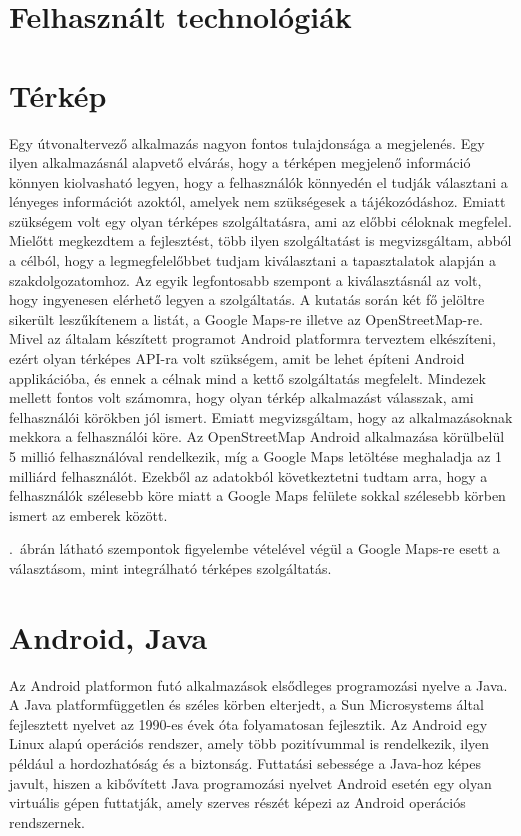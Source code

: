 	

\section{Felhasznált technológiák}
\label{felhaszntech}
\section*{Térkép}
Egy útvonaltervező alkalmazás nagyon fontos tulajdonsága a megjelenés. 
Egy ilyen alkalmazásnál alapvető elvárás, hogy a térképen megjelenő információ könnyen kiolvasható legyen, hogy a felhasználók könnyedén el tudják választani a lényeges információt azoktól, amelyek nem szükségesek a tájékozódáshoz. 
Emiatt szükségem volt egy olyan térképes szolgáltatásra, ami az előbbi céloknak megfelel. 
Mielőtt megkezdtem a fejlesztést, több ilyen szolgáltatást is megvizsgáltam, abból a célból, hogy a legmegfelelőbbet tudjam kiválasztani a tapasztalatok alapján a szakdolgozatomhoz. 
Az egyik legfontosabb szempont a kiválasztásnál az volt, hogy ingyenesen elérhető legyen a szolgáltatás. 
A kutatás során két fő jelöltre sikerült leszűkítenem a listát, a Google Maps-re illetve az OpenStreetMap-re. 
Mivel az általam készített programot Android platformra terveztem elkészíteni, ezért olyan térképes API-ra volt szükségem, amit be lehet építeni Android applikációba, és ennek a célnak mind a kettő szolgáltatás megfelelt. 
Mindezek mellett fontos volt számomra, hogy olyan térkép alkalmazást válasszak, ami felhasználói körökben jól ismert. 
Emiatt megvizsgáltam, hogy az alkalmazásoknak mekkora a felhasználói köre. 
Az OpenStreetMap Android alkalmazása körülbelül 5 millió  felhasználóval rendelkezik, míg a Google Maps letöltése meghaladja az 1 milliárd felhasználót. 
Ezekből az adatokból következtetni tudtam arra, hogy a felhasználók szélesebb köre miatt a Google Maps felülete sokkal szélesebb körben ismert az emberek között.


.\ ábrán látható szempontok figyelembe vételével végül a Google Maps-re esett a választásom, mint integrálható térképes szolgáltatás.

\section*{Android, Java}
Az Android platformon futó alkalmazások elsődleges programozási nyelve a Java.
A Java platformfüggetlen és széles körben elterjedt, a Sun Microsystems által fejlesztett nyelvet az 1990-es évek óta folyamatosan fejlesztik.
Az Android egy Linux alapú operációs rendszer, amely több pozitívummal is rendelkezik, ilyen például a hordozhatóság és a biztonság.
Futtatási sebessége a Java-hoz képes javult, hiszen a kibővített Java programozási nyelvet Android esetén egy olyan virtuális gépen futtatják, amely szerves részét képezi az Android operációs rendszernek. 

